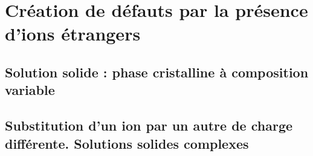 \chapter{Création de défauts par la présence d'ions étrangers}

\section{Solution solide : phase cristalline à composition variable}


\section{Substitution d'un ion par un autre de charge différente. Solutions solides complexes}